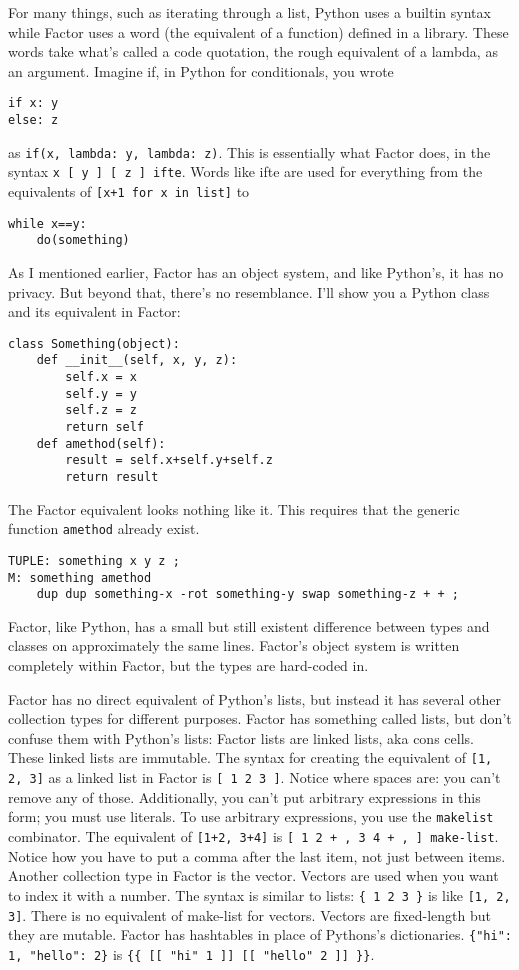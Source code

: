 \documentclass{article}
\begin{document}
For many things, such as iterating through a list, Python uses a builtin syntax while Factor uses a word (the equivalent of a function) defined in a library. These words take what's called a code quotation, the rough equivalent of a lambda, as an argument. Imagine if, in Python for conditionals, you wrote
\begin{verbatim}
if x: y
else: z
\end{verbatim}
as \verb|if(x, lambda: y, lambda: z)|. This is essentially what Factor does, in the syntax \verb|x [ y ] [ z ] ifte|. Words like ifte are used for everything from the equivalents of \verb|[x+1 for x in list]| to
\begin{verbatim}
while x==y:
    do(something)
\end{verbatim}

As I mentioned earlier, Factor has an object system, and like Python's, it has no privacy. But beyond that, there's no resemblance. I'll show you a Python class and its equivalent in Factor:
\begin{verbatim}
class Something(object):
    def __init__(self, x, y, z):
        self.x = x
        self.y = y
        self.z = z
        return self
    def amethod(self):
        result = self.x+self.y+self.z
        return result
\end{verbatim}
The Factor equivalent looks nothing like it. This requires that the generic function \texttt{amethod} already exist.
\begin{verbatim}
TUPLE: something x y z ;
M: something amethod
    dup dup something-x -rot something-y swap something-z + + ;
\end{verbatim}
Factor, like Python, has a small but still existent difference between types and classes on approximately the same lines. Factor's object system is written completely within Factor, but the types are hard-coded in.

Factor has no direct equivalent of Python's lists, but instead it has several other collection types for different purposes. Factor has something called lists, but don't confuse them with Python's lists: Factor lists are linked lists, aka cons cells. These linked lists are immutable. The syntax for creating the equivalent of \verb|[1, 2, 3]| as a linked list in Factor is \verb|[ 1 2 3 ]|. Notice where spaces are: you can't remove any of those. Additionally, you can't put arbitrary expressions in this form; you must use literals. To use arbitrary expressions, you use the \texttt{makelist} combinator. The equivalent of \verb|[1+2, 3+4]| is \verb|[ 1 2 + , 3 4 + , ] make-list|. Notice how you have to put a comma after the last item, not just between items. Another collection type in Factor is the vector. Vectors are used when you want to index it with a number. The syntax is similar to lists: \verb|{ 1 2 3 }| is like \verb|[1, 2, 3]|. There is no equivalent of make-list for vectors. Vectors are fixed-length but they are mutable. Factor has hashtables in place of Pythons's dictionaries. \verb|{"hi": 1, "hello": 2}| is \verb|{{ [[ "hi" 1 ]] [[ "hello" 2 ]] }}|.
\end{document}
